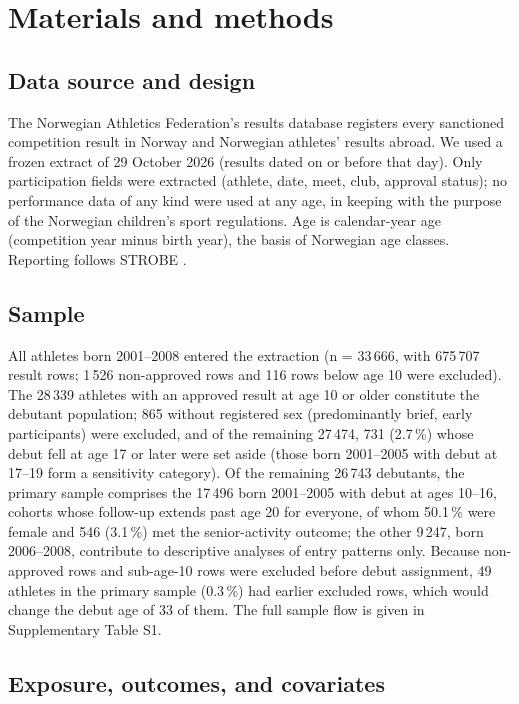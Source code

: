 \documentclass[12pt,a4paper]{article}
\begin{document}
\section{Materials and methods}

\subsection{Data source and design}

The Norwegian Athletics Federation's results database registers every sanctioned competition result in Norway and Norwegian athletes' results abroad. We used a frozen extract of 29 October 2026 (results dated on or before that day). Only participation fields were extracted (athlete, date, meet, club, approval status); no performance data of any kind were used at any age, in keeping with the purpose of the Norwegian children's sport regulations. Age is calendar-year age (competition year minus birth year), the basis of Norwegian age classes. Reporting follows STROBE \cite{vonelm2007}.

\subsection{Sample}

All athletes born 2001--2008 entered the extraction (n = 33\,666, with 675\,707 result rows; 1\,526 non-approved rows and 116 rows below age 10 were excluded). The 28\,339 athletes with an approved result at age 10 or older constitute the debutant population; 865 without registered sex (predominantly brief, early participants) were excluded, and of the remaining 27\,474, 731 (2.7\,\%) whose debut fell at age 17 or later were set aside (those born 2001--2005 with debut at 17--19 form a sensitivity category). Of the remaining 26\,743 debutants, the primary sample comprises the 17\,496 born 2001--2005 with debut at ages 10--16, cohorts whose follow-up extends past age 20 for everyone, of whom 50.1\,\% were female and 546 (3.1\,\%) met the senior-activity outcome; the other 9\,247, born 2006--2008, contribute to descriptive analyses of entry patterns only. Because non-approved rows and sub-age-10 rows were excluded before debut assignment, 49 athletes in the primary sample (0.3\,\%) had earlier excluded rows, which would change the debut age of 33 of them. The full sample flow is given in Supplementary Table S1.

\subsection{Exposure, outcomes, and covariates}
\end{document}
